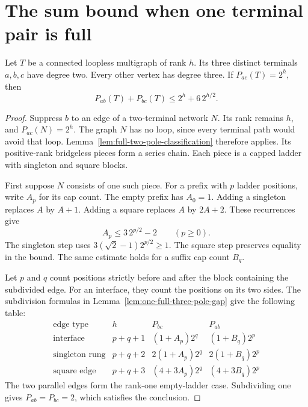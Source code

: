 \section{The sum bound when one terminal pair is full}
\label{sec:one-full-tripole-sum}

\begin{lemma}
\label{lem:one-full-tripole-sum}
Let $T$ be a connected loopless multigraph of rank $h$.
Its three distinct terminals $a,b,c$ have degree two.
Every other vertex has degree three.
If $P_{ac}(T)=2^h$, then
\[
 P_{ab}(T)+P_{bc}(T)\le2^h+6\,2^{h/2}.
\]
\end{lemma}

\begin{proof}
Suppress $b$ to an edge of a two-terminal network $N$.
Its rank remains $h$, and $P_{ac}(N)=2^h$.
The graph $N$ has no loop, since every terminal path would avoid that loop.
Lemma~\ref{lem:full-two-pole-classification} therefore applies.
Its positive-rank bridgeless pieces form a series chain.
Each piece is a capped ladder with singleton and square blocks.

First suppose $N$ consists of one such piece.
For a prefix with $p$ ladder positions, write $A_p$ for its cap count.
The empty prefix has $A_0=1$.
Adding a singleton replaces $A$ by $A+1$.
Adding a square replaces $A$ by $2A+2$.
These recurrences give
\begin{equation}\label{eq:tripole-prefix-cap}
 A_p\le3\,2^{p/2}-2\qquad(p\ge0).
\end{equation}
The singleton step uses
$3(\sqrt2-1)2^{p/2}\ge1$.
The square step preserves equality in the bound.
The same estimate holds for a suffix cap count $B_q$.

Let $p$ and $q$ count positions strictly before and after the block containing
the subdivided edge. For an interface, they count the positions on its two sides.
The subdivision formulas in Lemma~\ref{lem:one-full-three-pole-gap} give
the following table:
\[
\begin{array}{c|c|c|c}
\text{edge type}&h&P_{bc}&P_{ab}\\ \hline
\text{interface}&p+q+1&(1+A_p)2^q&(1+B_q)2^p\\
\text{singleton rung}&p+q+2&2(1+A_p)2^q&2(1+B_q)2^p\\
\text{square edge}&p+q+3&(4+3A_p)2^q&(4+3B_q)2^p
\end{array}
\]
The two parallel edges form the rank-one empty-ladder case.
Subdividing one gives $P_{ab}=P_{bc}=2$, which satisfies the conclusion.


\end{proof}
